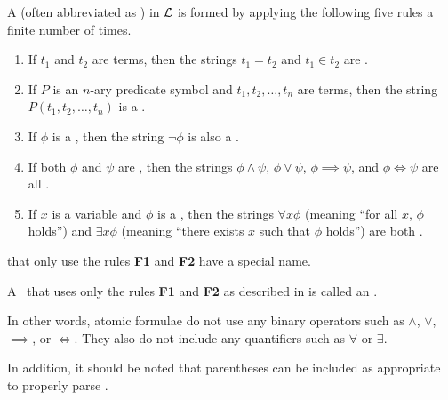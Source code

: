 \begin{definition}\label{definition:well-formed-formula}
    A  (often abbreviated as \wff{}) in $\mathcal{L}$ is formed by applying the following five rules a finite number of times.
    \begin{enumerate}[label=\textbf{F\arabic*.},leftmargin=1.35\parindent]
        \item If $t_1$ and $t_2$ are terms, then the strings $t_1=t_2$ and $t_1 \in t_2$ are \wff.  %
        \item If $P$ is an $n$-ary predicate symbol and $t_1, t_2, \dots, t_n$ are terms, then the string $P(t_1,t_2,\dots,t_n)$ is a \wff.
        \item If $\phi$ is a \wff, then the string $\lnot \phi$ is also a \wff.
        \item If both $\phi$ and $\psi$ are \wffs, then the strings $\phi\land\psi$, $\phi\lor\psi$, $\phi\implies\psi$, and $\phi\iff\psi$ are all \wffs.
        \item If $x$ is a variable and $\phi$ is a \wff, then the strings $\forall x\phi$ (meaning ``for all $x$, $\phi$ holds'') and $\exists x\phi$ (meaning ``there exists $x$ such that $\phi$ holds'') are both \wffs.
    \end{enumerate}
\end{definition}

\wffs* that only use the rules \textbf{F1} and \textbf{F2} have a special name.

\begin{definition}
    A \wff~that uses only the rules \textbf{F1} and \textbf{F2} as described in  is called an .
\end{definition}

In other words, atomic formulae do not use any binary operators such as $\land$, $\lor$, $\implies$, or $\iff$. They also do not include any quantifiers such as $\forall$ or $\exists$.

In addition, it should be noted that parentheses can be included as appropriate to properly parse \wffs.


